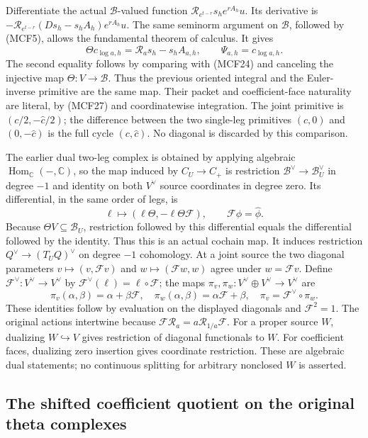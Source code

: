 Differentiate the actual $\mathscr B$-valued function
$\mathcal R_{e^{t-r}}s_he^{rA_h}u$.  Its derivative is
$-\mathcal R_{e^{t-r}}(Ds_h-s_hA_h)e^{rA_h}u$.
The same seminorm argument on $\mathscr B$, followed by (MCF5),
allows the fundamental theorem of calculus.  It gives
\[
\Theta c_{\log a,h}=\mathcal R_as_h-s_hA_{a,h},\qquad
\Psi_{a,h}=c_{\log a,h}.
\tag{MCF44}
\]
The second equality follows by comparing with (MCF24) and canceling
the injective map $\Theta:V\to\mathscr B$.  Thus the previous
oriented integral and the Euler-inverse primitive are the same map.
Their packet and coefficient-face naturality are literal, by
(MCF27) and coordinatewise integration.  The joint primitive is
$(c/2,-\widehat c/2)$; the difference between the two single-leg
primitives $(c,0)$ and $(0,-\widehat c)$ is the full cycle
$(c,\widehat c)$.  No diagonal is discarded by this comparison.

The earlier dual two-leg complex is obtained by applying algebraic
$\operatorname{Hom}_{\mathbb C}(-,\mathbb C)$, so the map induced
by $C_U\to C_+$ is restriction $\mathscr B^\vee\to\mathscr B_U^\vee$
in degree $-1$ and identity on both $V^\vee$ source coordinates in
degree zero.  Its differential, in the same order of legs, is
\[
\ell\longmapsto(\ell\Theta,-\ell\Theta\mathcal F),
\qquad \mathcal F\phi=\widehat\phi.
\tag{MCF45}
\]
Because $\Theta V\subseteq\mathscr B_U$, restriction followed by
this differential equals the differential followed by the identity.
Thus this is an actual cochain map.  It induces restriction
$Q^\vee\to(T_UQ)^\vee$ on degree $-1$ cohomology.  At a joint
source the two diagonal parameters $v\mapsto(v,\mathcal Fv)$ and
$w\mapsto(\mathcal Fw,w)$ agree under $w=\mathcal Fv$. Define
$\mathcal F^\vee:V^\vee\to V^\vee$ by
$\mathcal F^\vee(\ell)=\ell\circ\mathcal F$; the maps
$\pi_v,\pi_w:V^\vee\oplus V^\vee\to V^\vee$ are
\[
\pi_v(\alpha,\beta)=\alpha+\beta\mathcal F,
\quad \pi_w(\alpha,\beta)=\alpha\mathcal F+\beta,
\quad \pi_v=\mathcal F^\vee\circ\pi_w.
\tag{MCF46}
\]
These identities follow by evaluation on the displayed diagonals
and $\mathcal F^2=1$.  The original actions intertwine because
$\mathcal F\mathcal R_a=a\mathcal R_{1/a}\mathcal F$.
For a proper source $W$, dualizing $W\hookrightarrow V$ gives
restriction of diagonal functionals to $W$.  For coefficient faces,
dualizing zero insertion gives coordinate restriction.  These are
algebraic dual statements; no continuous splitting for arbitrary
nonclosed $W$ is asserted.
\subsection{The shifted coefficient quotient on the original theta complexes}

